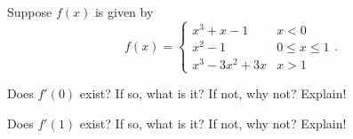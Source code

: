 \documentclass{hwset}
\begin{document}
\begin{problem}[5.] 
	Suppose $f(x)$ is given by
	\begin{equation*}
		f(x)=\begin{cases}
			x^{3}+x-1 & x< 0 \\
			x^{2}-1 &		0\leq x\leq 1 \\
			x^{3}-3x^{2}+3x & x > 1
		\end{cases}.
	\end{equation*}
	\be
		\item Does $f'(0)$ exist? If so, what is it? If not, why not? Explain!\\
		\item Does $f'(1)$ exist? If so, what is it? If not, why not? Explain!\\
	\ee
\end{problem}
\end{document}
